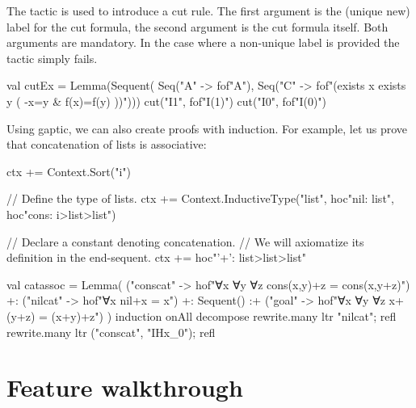 \documentclass[a4paper,11pt]{article}
\newcommand{\cli}[1]{{\ttfamily {#1}}}
\begin{document}
The \cli{cut} tactic is used to introduce a cut rule. The first argument is the
(unique new) label for the cut formula, the second argument is the cut formula
itself. Both arguments are mandatory. In the case where a non-unique label is
provided the tactic simply fails.
\begin{tacticslisting}
val cutEx = Lemma(Sequent(
    Seq("A" -> fof"A"),
    Seq("C" -> fof"(exists x exists y ( -x=y & f(x)=f(y) ))"))) {
  cut("I1", fof"I(1)")
  cut("I0", fof"I(0)")
}
\end{tacticslisting}

Using gaptic, we can also create proofs with induction.  For example, let us
prove that concatenation of lists is associative:

\begin{tacticslisting}[nosig]
ctx += Context.Sort("i")

// Define the type of lists.
ctx += Context.InductiveType("list",
  hoc"nil: list",
  hoc"cons: i>list>list")

// Declare a constant denoting concatenation.
// We will axiomatize its definition in the end-sequent.
ctx += hoc"'+': list>list>list"

val catassoc =
  Lemma(
      ("conscat" -> hof"∀x ∀y ∀z cons(x,y)+z = cons(x,y+z)") +:
      ("nilcat" -> hof"∀x nil+x = x") +:
      Sequent()
      :+ ("goal" -> hof"∀x ∀y ∀z x+(y+z) = (x+y)+z")
    ) {
  induction onAll decompose
  rewrite.many ltr "nilcat"; refl
  rewrite.many ltr ("conscat", "IHx_0"); refl
}
\end{tacticslisting}
\begin{tacticsoutput}
\end{tacticsoutput}

\section{Feature walkthrough}
\end{document}
